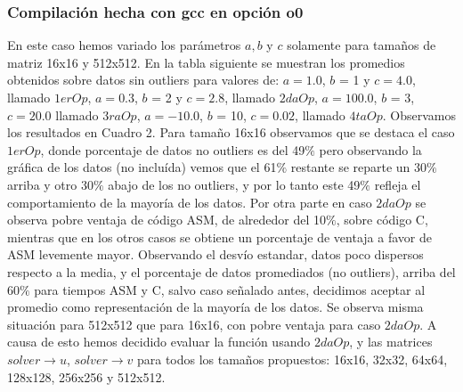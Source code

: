 \subsubsection{Compilación hecha con gcc en opción o0}
En este caso hemos variado los parámetros $a,b$ y $c$ solamente para tamaños de matriz 16x16 y 512x512. En la tabla siguiente se muestran los promedios obtenidos sobre datos sin outliers para valores de: $a = 1.0 $, $b$ = 1 y $c = 4.0$, llamado $1erOp$, $a = 0.3$, $b$ = 2 y $c = 2.8$, llamado $2daOp$, $a = 100.0$, $b$ = 3, $c = 20.0$ llamado $3raOp$, $a = -10.0$, $b$ = 10, $c = 0.02$, llamado $4taOp$. 
Observamos los resultados en Cuadro 2.
Para tamaño 16x16 observamos que se destaca el caso $1erOp$, donde porcentaje de datos no outliers es del 49$\%$ pero observando la gráfica de los datos (no incluída) vemos que el 61$\%$ restante se reparte un 30$\%$ arriba y otro 30$\%$ abajo de los no outliers, y por lo tanto este 49$\%$ refleja el comportamiento de la mayoría de los datos. Por otra parte en caso $2daOp$ se observa pobre ventaja de código ASM, de alrededor del 10$\%$, sobre código C, mientras que en los otros casos se obtiene un porcentaje de ventaja a favor de ASM levemente mayor. Observando el desvío estandar, datos poco dispersos respecto a la media, y el porcentaje de datos promediados (no outliers), arriba del 60$\%$ para tiempos ASM y C, salvo caso señalado antes, decidimos aceptar al promedio como representación de la mayoría de los datos. Se observa misma situación para 512x512 que para 16x16, con pobre ventaja para caso $2daOp$. A causa de esto hemos decidido evaluar la función usando $2daOp$, y las matrices $solver\rightarrow u$, $solver\rightarrow v$ para todos los tamaños propuestos: 16x16, 32x32, 64x64, 128x128, 256x256 y 512x512.
  
